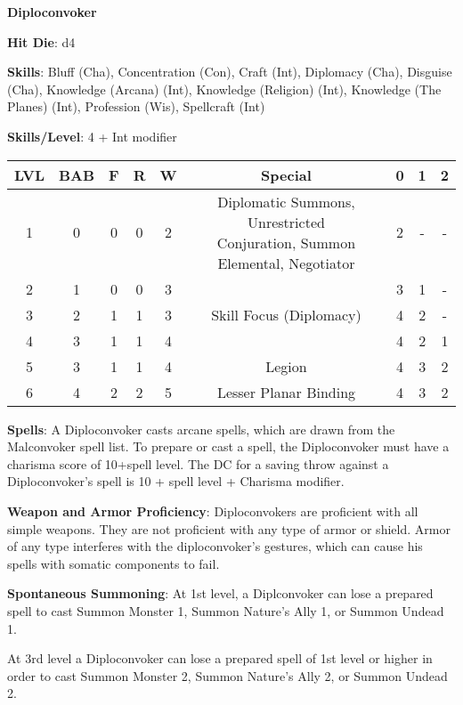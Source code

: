\textbf{\huge{Diploconvoker}}

\textbf{Hit Die}: d4

\textbf{Skills}: Bluff (Cha), Concentration (Con), Craft (Int), Diplomacy (Cha), Disguise (Cha), Knowledge (Arcana) (Int), Knowledge (Religion) (Int), Knowledge (The Planes) (Int), Profession (Wis), Spellcraft (Int)

\textbf{Skills/Level}: 4 + Int modifier

\begin{center}
\begin{adjustwidth}{-4cm}{}
\begin{small}
\begin{tabular}{| c | c | c | c | c | c | c | c | c |}
\hline
LVL &BAB &F &R &W &Special &0 &1 &2 \\
\hline
1 &0 &0 &0 &2 &\makecell{Diplomatic Summons, Unrestricted\\ Conjuration, Summon Elemental, Negotiator} &2 &- &- \\
2 &1 &0 &0 &3 & &3 &1 &- \\
3 &2 &1 &1 &3 &Skill Focus (Diplomacy) &4 &2 &- \\
4 &3 &1 &1 &4 & &4 &2 &1 \\
5 &3 &1 &1 &4 &Legion &4 &3 &2 \\
6 &4 &2 &2 &5 &Lesser Planar Binding &4 &3 &2 \\
\hline
\end{tabular}
\end{small}
\end{adjustwidth}
\end{center}

\textbf{Spells}: A Diploconvoker casts arcane spells, which are drawn from the Malconvoker spell list. To prepare or cast a spell, the Diploconvoker must have a charisma score of 10+spell level. The DC for a saving throw against a Diploconvoker’s spell is 10 + spell level + Charisma modifier. 

\textbf{Weapon and Armor Proficiency}: Diploconvokers are proficient with all simple weapons. They are not proficient with any type of armor or shield. Armor of any type interferes with the diploconvoker's gestures, which can cause his spells with somatic components to fail.

\textbf{Spontaneous Summoning}: At 1st level, a Diplconvoker can lose a prepared spell to cast Summon Monster 1, Summon Nature’s Ally 1, or Summon Undead 1.

At 3rd level a Diploconvoker can lose a prepared spell of 1st level or higher in order to cast Summon Monster 2, Summon Nature’s Ally 2, or Summon Undead 2.

